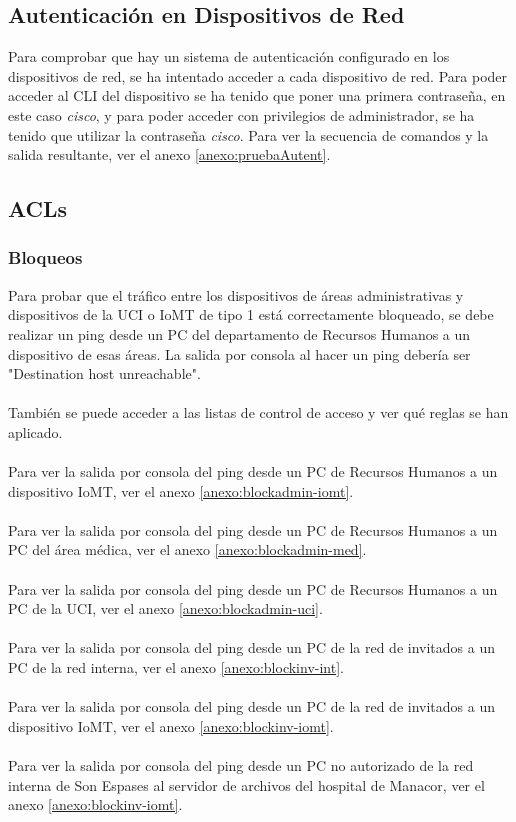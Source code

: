 \subsection{Autenticación en Dispositivos de Red}
Para comprobar que hay un sistema de autenticación configurado en los dispositivos de red, se ha intentado acceder a cada dispositivo de red. Para poder acceder al CLI del dispositivo se ha tenido que poner una primera contraseña, 
en este caso \textit{cisco}, y para poder acceder con privilegios de administrador, se ha tenido que utilizar la contraseña \textit{cisco}. Para ver la secuencia de comandos y la salida resultante, ver el anexo \ref{anexo:pruebaAutent}.

\subsection{ACLs}
\subsubsection{Bloqueos}
Para probar que el tráfico entre los dispositivos de áreas administrativas y dispositivos de la UCI o IoMT de tipo 1 está correctamente bloqueado, se debe realizar un ping desde un PC del departamento de Recursos Humanos 
a un dispositivo de esas áreas. La salida por consola al hacer un ping debería ser "Destination host unreachable".
\\ \\ 
También se puede acceder a las listas de control de acceso y ver qué reglas se han aplicado.
\\ \\ 
Para ver la salida por consola del ping desde un PC de Recursos Humanos a un dispositivo IoMT, ver el anexo \ref{anexo:blockadmin-iomt}.
\\ \\ 
Para ver la salida por consola del ping desde un PC de Recursos Humanos a un PC del área médica, ver el anexo \ref{anexo:blockadmin-med}.
\\ \\ 
Para ver la salida por consola del ping desde un PC de Recursos Humanos a un PC de la UCI, ver el anexo \ref{anexo:blockadmin-uci}.
\\ \\ 
Para ver la salida por consola del ping desde un PC de la red de invitados a un PC de la red interna, ver el anexo \ref{anexo:blockinv-int}.
\\ \\ 
Para ver la salida por consola del ping desde un PC de la red de invitados a un dispositivo IoMT, ver el anexo \ref{anexo:blockinv-iomt}.
\\ \\ 
Para ver la salida por consola del ping desde un PC no autorizado de la red interna de Son Espases al servidor de archivos del hospital de Manacor, ver el anexo \ref{anexo:blockinv-iomt}.

